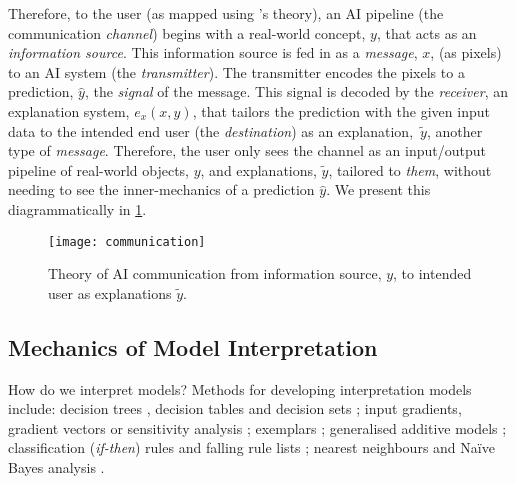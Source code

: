 Therefore, to the user (as mapped using \citeauthor{Shannon:1963ti}'s theory), an AI pipeline (the communication \textit{channel}) begins with a real-world concept, $y$, that acts as an \textit{information source}. This information source is fed in as a \textit{message}, $x$, (as pixels) to an AI system (the \textit{transmitter}). The transmitter encodes the pixels to a prediction, $\hat{y}$, the \textit{signal} of the message. This signal is decoded by the \textit{receiver}, an explanation system, $e_{x}(x,\hat{y})$, that tailors the prediction with the given input data to the intended end user (the \textit{destination}) as an explanation,~$\tilde{y}$, another type of \textit{message}. Therefore, the user only sees the channel as an input/output pipeline of real-world objects, $y$, and explanations, $\tilde{y}$, tailored to \textit{them}, without needing to see the inner-mechanics of a prediction $\hat{y}$. We present this diagrammatically in \cref{fig:background:probabilistic-stochastic:theory-of-ai-communication}.

\begin{figure}[hbt]
  \centering
  \texttt{[image: communication]}
  \caption[Theory of AI communication]{Theory of AI communication from information source, $y$, to intended user as explanations $\tilde{y}$.}
  \label{fig:background:probabilistic-stochastic:theory-of-ai-communication}
\end{figure}

\subsection{Mechanics of Model Interpretation}
\label{ssec:background:probabilistic-stochastic:mechanics}

How do we interpret models? Methods for developing interpretation models include: decision trees \citep{Breiman:1984tu,Hastie:2001wp,Craven:1995wg,Quinlan:1993vi,Rokach:2008wc}, decision tables \citep{Lima:2009tm,Baesens:2003we} and decision sets \citep{Lakkaraju:2016ka,Narayanan:2018ud}; input gradients, gradient vectors or sensitivity analysis \citep{Selvaraju:2017bk,Ribeiro:2016gg,Lei:2016wi,Ross:2017vn,Baehrens:2010tj}; exemplars \citep{Kim:2014ui,Frey:2007hs}; generalised additive models \citep{Caruana:2015jk}; classification (\textit{if-then}) rules \citep{Thrun:1996wh,Bramer:2007vg,Clark:1991vi,Otero:2013ul,Witten:2016ut} and falling rule lists \citep{Singh:2016wu}; nearest neighbours \citep{Martens:2011uh,Sen:1995uk,Suri:2007wl,Wettschereck:1997vw,Zhang:2008vfa} and Na\"{i}ve Bayes analysis \citep{Bellazzi:2008tv,Lavrac:1999tf,Kononenko:1993td,Zupan:2000tp,Michie:1994wi,Friedman:1997vs,Cheng:2001vw,Heckerman:2000uw}. 

